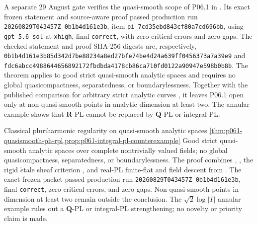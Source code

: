 
A separate 29 August gate verifies the quasi-smooth scope of P06.1 in
.  Its exact frozen statement and
source-aware proof passed production run
\nolinkurl{20260829T043457Z_0b1b4d161e3b}, item
\nolinkurl{pi_7cd35ebd843cf80a7cd696bb}, using
\texttt{gpt-5.6-sol} at \texttt{xhigh}, final \texttt{correct}, with zero
critical errors and zero gaps.  The checked statement and proof SHA-256
digests are, respectively,
\nolinkurl{0b1b4d161e3b85d342d7be88234a8ed27bfe74be4d24a639ff0456373a7a39e9}
and
\nolinkurl{fdc6abcc4988644656892172fbdbda4178cb86ca710fd0122a90947e598b0b8b}.
The theorem applies to good strict quasi-smooth analytic spaces and requires
no global quasicompactness, separatedness, or boundarylessness.  Together
with the published comparison for arbitrary strict analytic curves
\cite[\S4.1.2 and Proposition~3.15]{GR25Classical}, it leaves P06.1 open only
at non-quasi-smooth points in analytic dimension at least two.
The annular example  shows that
\(\mathbf R\)-PL cannot be replaced by \(\mathbf Q\)-PL or integral PL.

\AppLProvenanceRecord
  {Classical pluriharmonic regularity on quasi-smooth analytic spaces}
  {\cref{thm:p061-quasismooth-ph-rpl,prop:p061-integral-pl-counterexample}}
  {Good strict quasi-smooth analytic spaces over complete nontrivially valued
   fields; no global quasicompactness, separatedness, or boundarylessness.
   The proof combines \cite[Proposition~7.8]{GR25Classical},
   \cite[Corollary~3.3.2]{Temkin17}, the rigid \(\acute{e}\)tale sheaf
   criterion \cite[Proposition~3.2.2]{dJvdP96}, and real-PL finite-flat and
   field descent from \cite{GJR26}.  The exact frozen packet passed production
   run \nolinkurl{20260829T043457Z_0b1b4d161e3b}, final \texttt{correct},
   zero critical errors, and zero gaps.  Non-quasi-smooth points in dimension
   at least two remain outside the conclusion.  The \(\sqrt{2}\log|T|\) annular example rules out a
   \(\mathbf Q\)-PL or integral-PL strengthening; no novelty or priority
   claim is made.}

